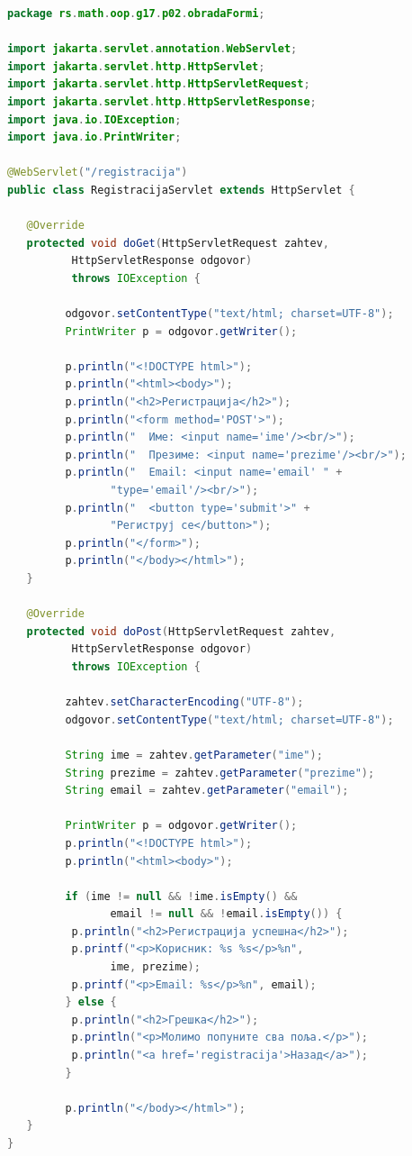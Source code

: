 \begin{lstlisting}[language=Java]
package rs.math.oop.g17.p02.obradaFormi;
 
import jakarta.servlet.annotation.WebServlet;
import jakarta.servlet.http.HttpServlet;
import jakarta.servlet.http.HttpServletRequest;
import jakarta.servlet.http.HttpServletResponse;
import java.io.IOException;
import java.io.PrintWriter;
 
@WebServlet("/registracija")
public class RegistracijaServlet extends HttpServlet {
 
   @Override
   protected void doGet(HttpServletRequest zahtev,
          HttpServletResponse odgovor)
          throws IOException {
 
         odgovor.setContentType("text/html; charset=UTF-8");
         PrintWriter p = odgovor.getWriter();
 
         p.println("<!DOCTYPE html>");
         p.println("<html><body>");
         p.println("<h2>Регистрација</h2>");
         p.println("<form method='POST'>");
         p.println("  Име: <input name='ime'/><br/>");
         p.println("  Презиме: <input name='prezime'/><br/>");
         p.println("  Email: <input name='email' " +
                "type='email'/><br/>");
         p.println("  <button type='submit'>" +
                "Региструј се</button>");
         p.println("</form>");
         p.println("</body></html>");
   }
 
   @Override
   protected void doPost(HttpServletRequest zahtev,
          HttpServletResponse odgovor)
          throws IOException {
 
         zahtev.setCharacterEncoding("UTF-8");
         odgovor.setContentType("text/html; charset=UTF-8");
 
         String ime = zahtev.getParameter("ime");
         String prezime = zahtev.getParameter("prezime");
         String email = zahtev.getParameter("email");
 
         PrintWriter p = odgovor.getWriter();
         p.println("<!DOCTYPE html>");
         p.println("<html><body>");
 
         if (ime != null && !ime.isEmpty() &&
                email != null && !email.isEmpty()) {
          p.println("<h2>Регистрација успешна</h2>");
          p.printf("<p>Корисник: %s %s</p>%n",
                ime, prezime);
          p.printf("<p>Email: %s</p>%n", email);
         } else {
          p.println("<h2>Грешка</h2>");
          p.println("<p>Молимо попуните сва поља.</p>");
          p.println("<a href='registracija'>Назад</a>");
         }
 
         p.println("</body></html>");
   }
}
\end{lstlisting}



